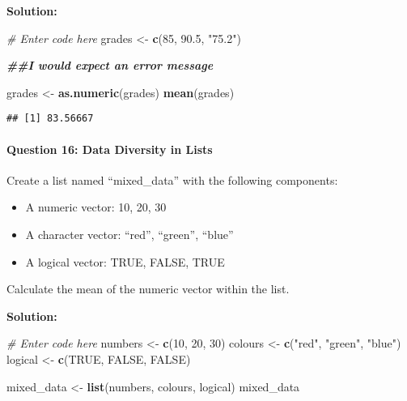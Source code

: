 \documentclass[
]{article}
\newenvironment{Shaded}{\begin{snugshade}}{\end{snugshade}}
\newcommand{\CommentTok}[1]{\textcolor[rgb]{0.56,0.35,0.01}{\textit{#1}}}
\newcommand{\ConstantTok}[1]{\textcolor[rgb]{0.56,0.35,0.01}{#1}}
\newcommand{\DecValTok}[1]{\textcolor[rgb]{0.00,0.00,0.81}{#1}}
\newcommand{\DocumentationTok}[1]{\textcolor[rgb]{0.56,0.35,0.01}{\textbf{\textit{#1}}}}
\newcommand{\FloatTok}[1]{\textcolor[rgb]{0.00,0.00,0.81}{#1}}
\newcommand{\FunctionTok}[1]{\textcolor[rgb]{0.13,0.29,0.53}{\textbf{#1}}}
\newcommand{\NormalTok}[1]{#1}
\newcommand{\OtherTok}[1]{\textcolor[rgb]{0.56,0.35,0.01}{#1}}
\newcommand{\StringTok}[1]{\textcolor[rgb]{0.31,0.60,0.02}{#1}}
\begin{document}
\textbf{Solution:}

\begin{Shaded}
\begin{Highlighting}[]
\CommentTok{\# Enter code here}
\NormalTok{grades }\OtherTok{\textless{}{-}} \FunctionTok{c}\NormalTok{(}\DecValTok{85}\NormalTok{, }\FloatTok{90.5}\NormalTok{, }\StringTok{"75.2"}\NormalTok{)}

\DocumentationTok{\#\#I would expect an error message}

\NormalTok{grades }\OtherTok{\textless{}{-}} \FunctionTok{as.numeric}\NormalTok{(grades)}
\FunctionTok{mean}\NormalTok{(grades)}
\end{Highlighting}
\end{Shaded}

\begin{verbatim}
## [1] 83.56667
\end{verbatim}

\hypertarget{question-16-data-diversity-in-lists}{%
\paragraph{Question 16: Data Diversity in
Lists}\label{question-16-data-diversity-in-lists}}

Create a list named ``mixed\_data'' with the following components:

\begin{itemize}
\item
  A numeric vector: 10, 20, 30
\item
  A character vector: ``red'', ``green'', ``blue''
\item
  A logical vector: TRUE, FALSE, TRUE
\end{itemize}

Calculate the mean of the numeric vector within the list.

\textbf{Solution:}

\begin{Shaded}
\begin{Highlighting}[]
\CommentTok{\# Enter code here}
\NormalTok{numbers }\OtherTok{\textless{}{-}} \FunctionTok{c}\NormalTok{(}\DecValTok{10}\NormalTok{, }\DecValTok{20}\NormalTok{, }\DecValTok{30}\NormalTok{)}
\NormalTok{colours }\OtherTok{\textless{}{-}} \FunctionTok{c}\NormalTok{(}\StringTok{"red"}\NormalTok{, }\StringTok{"green"}\NormalTok{, }\StringTok{"blue"}\NormalTok{)}
\NormalTok{logical }\OtherTok{\textless{}{-}} \FunctionTok{c}\NormalTok{(}\ConstantTok{TRUE}\NormalTok{, }\ConstantTok{FALSE}\NormalTok{, }\ConstantTok{FALSE}\NormalTok{)}

\NormalTok{mixed\_data }\OtherTok{\textless{}{-}} \FunctionTok{list}\NormalTok{(numbers, colours, logical)}
\NormalTok{mixed\_data}
\end{Highlighting}
\end{Shaded}
\end{document}
